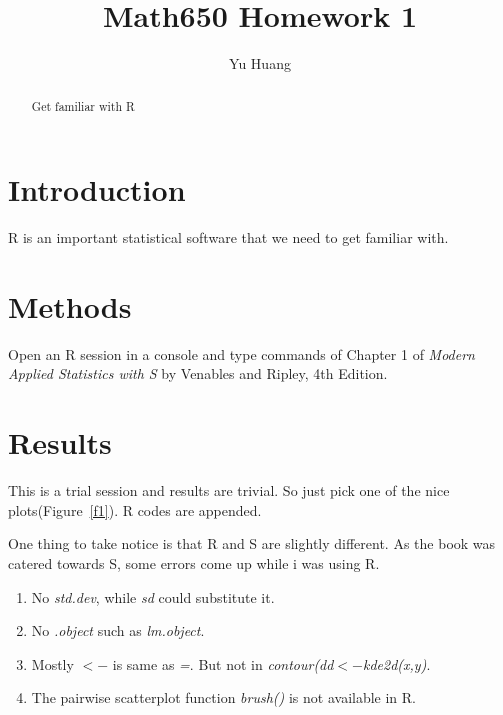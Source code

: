 \documentclass[a4paper,10pt]{article}
\title{Math650 Homework 1}
\author{Yu Huang}
\begin{document}
\maketitle

\begin{abstract}
Get familiar with R
\end{abstract}

\section{Introduction}
R is an important statistical software that we need to get familiar with.

\section{Methods}
Open an R session in a console and type commands of Chapter 1 of \emph{Modern Applied Statistics with  S} by Venables and Ripley, 4th Edition.

\section{Results}


This is a trial session and results are trivial. So just pick one of the nice plots(Figure~\ref{f1}). R codes are appended.


One thing to take notice is that R and S are slightly different. As the book was catered towards S, some errors come up while i was using R.
\begin{enumerate}
\item No \emph{std.dev}, while \emph{sd} could substitute it.
\item No \emph{.object} such as \emph{lm.object}.
\item Mostly \emph{$<-$} is same as \emph{=}. But not in \emph{contour(dd$<-$kde2d(x,y)}.
\item The pairwise scatterplot function \emph{brush()} is not available in R.
\end{enumerate}
\end{document}
